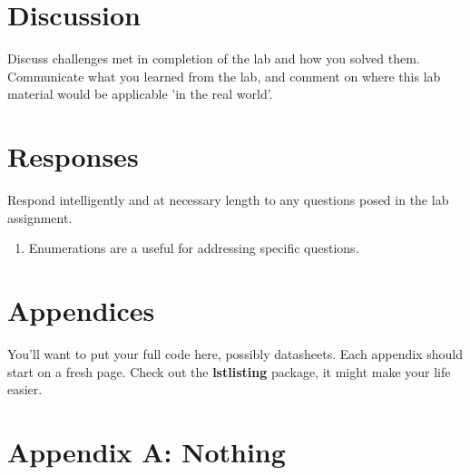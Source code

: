 \documentclass[letterpaper,11pt]{texMemo} %
\begin{document}
\section*{Discussion}
Discuss challenges met in completion of the lab and how you solved them. Communicate what you learned from the lab, and comment on where this lab material would be applicable 'in the real world'. 

\section*{Responses}
Respond intelligently and at necessary length to any questions posed in the lab assignment.
\begin{enumerate}
\item Enumerations are a useful for addressing specific questions.
\end{enumerate} 

\section*{Appendices}
You'll want to put your full code here, possibly datasheets. Each appendix should start on a fresh page. Check out the \textbf{lstlisting} package, it might make your life easier. 
\newpage

\section*{Appendix A: Nothing}

\end{document}
